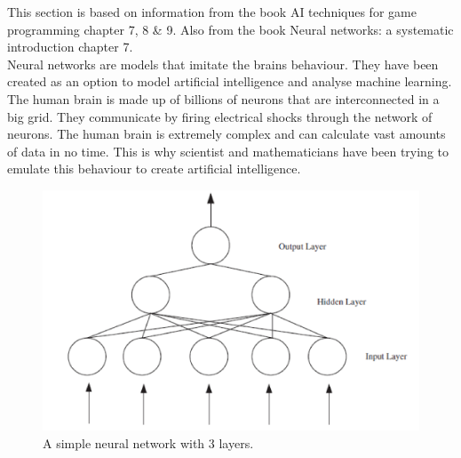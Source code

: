 This section is based on information from the book AI techniques for game programming\cite{buckland2002ai} chapter 7, 8 \& 9. Also from the book Neural networks: a systematic introduction\cite{rojas1996neural} chapter 7.
\\[0.5cm]
Neural networks are models that imitate the brains behaviour. They have been created as an option to model artificial intelligence and analyse machine learning. The human brain is made up of billions of neurons that are interconnected in a big grid. They communicate by firing electrical shocks through the network of neurons. The human brain is extremely complex and can calculate vast amounts of data in no time. This is why scientist and mathematicians have been trying to emulate this behaviour to create artificial intelligence.

\begin{figure}[weight!]
\centering
\includegraphics[width=0.8\linewidth,natwidth=898,natheight=587]{billeder/ANN.png}
\caption{A simple neural network with 3 layers. \cite{stockForecasting}}
\label{fig:weight_of_layers}
\end{figure}

